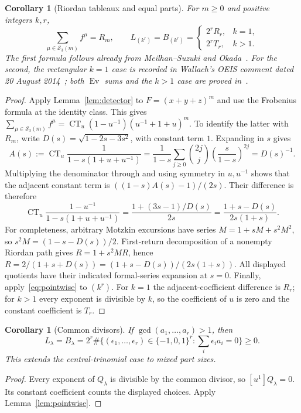 \documentclass[11pt]{article}
\newcommand{\Ev}{\operatorname{Ev}}
\newcommand{\CT}{\operatorname{CT}}
\newtheorem{corollary}[theorem]{Corollary}
\begin{document}
\begin{corollary}[Riordan tableaux and equal parts]\label{cor:riordan}
For $m\geq0$ and positive integers $k,r$,
\[
 \sum_{\mu\in\mathcal S_3(m)} f^\mu=R_m,\qquad
 L_{(k^r)}=B_{(k^r)}=
 \begin{cases}2^rR_r,&k=1,\\2^rT_r,&k>1.\end{cases}
\]
The first formula follows already from Meilhan--Suzuki
\cite[Lemma 3.7]{MS} and Okada~\cite[Corollary 5.5(3)]{O}.
For the second, the rectangular $k=1$ case is recorded in Wallach's OEIS
comment dated 20 August 2014~\cite{OEIS}; both $\Ev$ sums and the $k>1$
case are proved in~\cite[Sections 4--5]{HSW}.
\end{corollary}
\begin{proof}
Apply Lemma~\ref{lem:detector} to $F=(x+y+z)^m$ and use the
Frobenius formula at the identity class. This gives
$\sum_{\mu\in\mathcal S_3(m)}f^\mu
=\CT_u(1-u^{-1})(u^{-1}+1+u)^m$.
To identify the latter with $R_m$, write
$D(s)=\sqrt{1-2s-3s^2}$, with constant term $1$.
Expanding in $s$ gives
\[
 A(s):=\CT_u\frac1{1-s(1+u+u^{-1})}=
 \frac1{1-s}\sum_{j\geq0}\binom{2j}{j}
       \left(\frac{s}{1-s}\right)^{2j}=D(s)^{-1}.
\]
Multiplying the denominator through and using symmetry in $u,u^{-1}$
shows that the adjacent constant term is
$((1-s)A(s)-1)/(2s)$. Their difference is therefore
\[
 \CT_u\frac{1-u^{-1}}{1-s(1+u+u^{-1})}
 =\frac{1+(3s-1)/D(s)}{2s}
 =\frac{1+s-D(s)}{2s(1+s)}.
\]
For completeness, arbitrary Motzkin excursions have series
$M=1+sM+s^2M^2$, so $s^2M=(1-s-D(s))/2$.
First-return decomposition of a nonempty Riordan path gives
$R=1+s^2MR$, hence
$R=2/(1+s+D(s))=(1+s-D(s))/(2s(1+s))$.
All displayed quotients have their indicated formal-series expansion at
$s=0$. Finally, apply~\eqref{eq:pointwise} to $(k^r)$.
For $k=1$ the adjacent-coefficient difference is $R_r$; for $k>1$
every exponent is divisible by $k$, so the coefficient of $u$ is zero
and the constant coefficient is $T_r$.
\end{proof}

\begin{corollary}[Common divisors]\label{cor:gcd}
If $\gcd(a_1,\ldots,a_r)>1$, then
\[
 L_\lambda=B_\lambda
 =2^r\#\{(\epsilon_1,\ldots,\epsilon_r)\in\{-1,0,1\}^r:
                   \textstyle\sum_i\epsilon_i a_i=0\}\geq0.
\]
This extends the central-trinomial case to mixed part sizes.
\end{corollary}
\begin{proof}
Every exponent of $Q_\lambda$ is divisible by the common divisor,
so $[u^1]Q_\lambda=0$. Its constant coefficient counts the displayed
choices. Apply Lemma~\ref{lem:pointwise}.
\end{proof}
\end{document}

